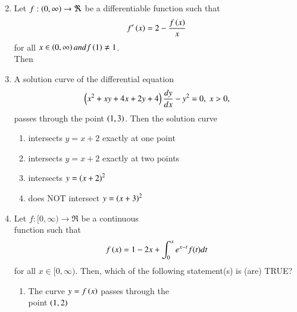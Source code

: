 \documentclass[journal,12pt,onecolumn,article]{IEEEtran}
\theoremstyle{remark}
\begin{document}
\begin{enumerate}[start = 6]
\begin{enumerate}
\begin{multicols}{2}
\end{multicols}
\end{enumerate}
\item Let $f:\left(0,\infty\right) \rightarrow \Re$ be a differentiable function such that 
\begin{align}
f^\prime\left(x\right) = 2-\frac{f\left(x\right)}{x}
\end{align} for all $x \in \left(0,\infty\right) and f\left(1\right) \neq 1$. \\Then
\hfill{}
\begin{enumerate}
\end{enumerate}
\item A solution curve of the differential equation 
\begin{align}
\left(x^2+xy+4x+2y+4\right)\frac{dy}{dx}-y^2=0,\;x>0,
\end{align} passes through the point $\left(1,3\right)$. Then the solution curve
\hfill{}
\begin{enumerate}
\item intersects $y=x+2$ exactly at one point
\item intersects $y=x+2$ exactly at two points
\item intersects $y=\left(x+2\right)^2$ 
\item does NOT intersect $y=\left(x+3\right)^2$
\end{enumerate}
\item Let $f:[0,\infty)\rightarrow \Re$ be a continuous \\function such that
\begin{align}
f\left(x\right) = 1-2x+ \int_0^x e^{x-t} f(t) dt
\end{align} for all $x\in[0,\infty)$. Then, which of the following statement(s) is (are) TRUE?
\hfill{}
\begin{enumerate}
\item The curve $y=f\left(x\right)$ passes through the \\point $\left(1,2\right)$

\end{enumerate}
\end{enumerate}
\end{document}
